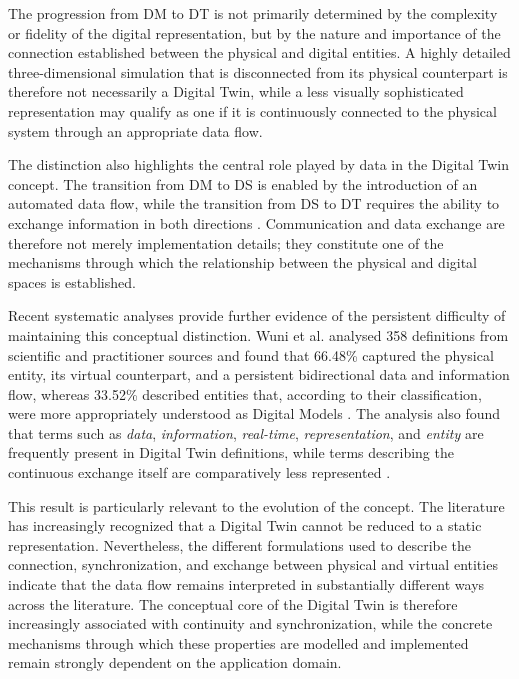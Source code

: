 The progression from DM to DT is not primarily determined by the complexity or fidelity of the digital representation, but by the nature and importance of the connection established between the physical and digital entities. A highly detailed three-dimensional simulation that is disconnected from its physical counterpart is therefore not necessarily a Digital Twin, while a less visually sophisticated representation may qualify as one if it is continuously connected to the physical system through an appropriate data flow.

The distinction also highlights the central role played by data in the Digital Twin concept. The transition from DM to DS is enabled by the introduction of an automated data flow, while the transition from DS to DT requires the ability to exchange information in both directions \cite{kritzinger2018,fuller2020}. Communication and data exchange are therefore not merely implementation details; they constitute one of the mechanisms through which the relationship between the physical and digital spaces is established.

Recent systematic analyses provide further evidence of the persistent difficulty of maintaining this conceptual distinction. Wuni et al. analysed 358 definitions from scientific and practitioner sources and found that 66.48\% captured the physical entity, its virtual counterpart, and a persistent bidirectional data and information flow, whereas 33.52\% described entities that, according to their classification, were more appropriately understood as Digital Models \cite{wuni2026}. The analysis also found that terms such as \emph{data}, \emph{information}, \emph{real-time}, \emph{representation}, and \emph{entity} are frequently present in Digital Twin definitions, while terms describing the continuous exchange itself are comparatively less represented \cite{wuni2026}.

This result is particularly relevant to the evolution of the concept. The literature has increasingly recognized that a Digital Twin cannot be reduced to a static representation. Nevertheless, the different formulations used to describe the connection, synchronization, and exchange between physical and virtual entities indicate that the data flow remains interpreted in substantially different ways across the literature. The conceptual core of the Digital Twin is therefore increasingly associated with continuity and synchronization, while the concrete mechanisms through which these properties are modelled and implemented remain strongly dependent on the application domain.

